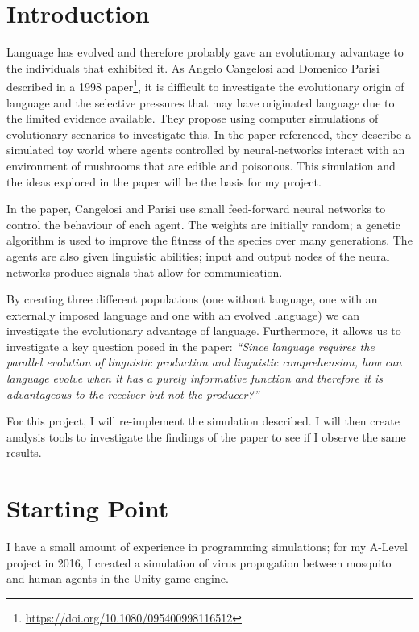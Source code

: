 \documentclass[12pt,a4paper,twoside]{article}
\begin{document}
\newcommand{\sups}{\textsuperscript}

\section*{Introduction}


Language has evolved and therefore probably gave an evolutionary advantage to the individuals that exhibited it. As Angelo Cangelosi and Domenico Parisi described in a 1998 paper\footnote{\url{https://doi.org/10.1080/095400998116512}}, it is difficult to investigate the evolutionary origin of language and the selective pressures that may have originated language due to the limited evidence available. They propose using computer simulations of evolutionary scenarios to investigate this. In the paper referenced, they describe a simulated toy world where agents controlled by neural-networks interact with an environment of mushrooms that are edible and poisonous. This simulation and the ideas explored in the paper will be the basis for my project.

In the paper, Cangelosi and Parisi use small feed-forward neural networks to control the behaviour of each agent. The weights are initially random; a genetic algorithm is used to improve the fitness of the species over many generations. The agents are also given linguistic abilities; input and output nodes of the neural networks produce signals that allow for communication.

By creating three different populations (one without language, one with an externally imposed language and one with an evolved language) we can investigate the evolutionary advantage of language. Furthermore, it allows us to investigate a key question posed in the paper: \emph{``Since language requires the parallel evolution of linguistic production and linguistic comprehension, how can language evolve when it has a purely informative function and therefore it is advantageous to the receiver but not the producer?''}

For this project, I will re-implement the simulation described. I will then create analysis tools to investigate the findings of the paper to see if I observe the same results.

\section*{Starting Point}

I have a small amount of experience in programming simulations; for my A-Level project in 2016, I created a simulation of virus propogation between mosquito and human agents in the Unity game engine.
\end{document}
